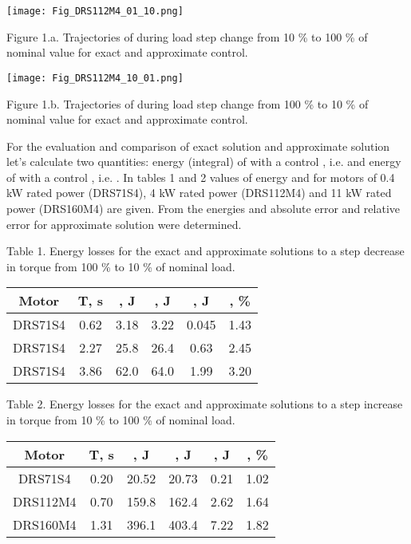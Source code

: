 \documentclass[journal]{IEEEtran}
\begin{document}
\begin{center}
\ifpdf \texttt{[image: Fig\_DRS112M4\_01\_10.png]}
\fi

Figure 1.a. Trajectories of  during load step change from 10 \% to 100 \% of nominal value for exact  and approximate  control.

\ifpdf \texttt{[image: Fig\_DRS112M4\_10\_01.png]}
\fi

Figure 1.b. Trajectories of  during load step change from 100 \% to 10 \% of nominal value for exact  and approximate  control.
\end{center}

For the evaluation and comparison of exact solution  and approximate solution  let's calculate two quantities: energy (integral) of  with a control , i.e.  and energy of  with a control , i.e. . In tables 1 and 2 values of energy  and  for motors of 0.4 kW rated power (DRS71S4), 4 kW rated power (DRS112M4) and 11 kW rated power (DRS160M4) are given. From the energies  and  absolute error  and relative error  for approximate solution were determined.


\begin{center}
Table 1.
Energy losses for the exact and approximate solutions to a step decrease in torque from 100 \% to 10 \% of nominal load.

\begin{tabular}{ | c | c | c | c | c | c | }
\hline 
Motor & T, s & , J & , J & , J & , \% \\
\hline 
DRS71S4  & 0.62 & 3.18 & 3.22 & 0.045 & 1.43 \\
DRS71S4  & 2.27 & 25.8 & 26.4 & 0.63 & 2.45 \\
DRS71S4  & 3.86 & 62.0 & 64.0 & 1.99 & 3.20 \\
\hline 
\end{tabular}

\end{center}

\begin{center}
Table 2.
Energy losses for the exact and approximate solutions to a step increase in torque from 10 \% to 100 \% of nominal load.

\begin{tabular}{ | c | c | c | c | c | c | }
\hline 
Motor & T, s & , J & , J & , J & , \% \\
\hline 
DRS71S4  & 0.20 & 20.52 & 20.73 & 0.21 & 1.02 \\
DRS112M4 & 0.70 & 159.8 & 162.4 & 2.62 & 1.64 \\
DRS160M4 & 1.31 & 396.1 & 403.4 & 7.22 & 1.82 \\
\hline 
\end{tabular}

\end{center}
\end{document}
